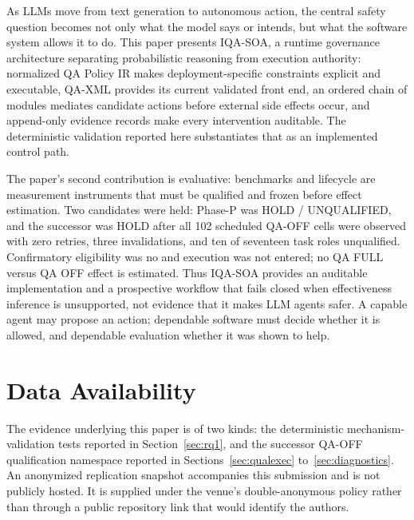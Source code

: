 \documentclass[acmsmall,screen,review,anonymous]{acmart}
\begin{document}
As LLMs move from text generation to autonomous action, the central safety question
becomes not only what the model says or intends, but what the software system
allows it to do. This paper presents IQA-SOA, a runtime governance architecture
separating probabilistic reasoning from execution authority: normalized QA Policy
IR makes deployment-specific constraints explicit and executable, QA-XML provides
its current validated front end, an ordered chain of modules mediates candidate
actions before external side effects occur, and
append-only evidence records make every intervention auditable. The deterministic
validation reported here substantiates that as an implemented control path.

The paper's second contribution is evaluative: benchmarks and lifecycle are
measurement instruments that must be qualified and frozen before effect estimation.
Two candidates were held: Phase-P was HOLD / UNQUALIFIED, and the successor was
HOLD after all 102 scheduled QA-OFF cells were observed with zero retries, three
invalidations, and ten of seventeen task roles unqualified. Confirmatory eligibility
was no and execution was not entered; no QA FULL versus QA OFF effect is estimated.
Thus IQA-SOA provides an auditable implementation and a prospective workflow that
fails closed when effectiveness inference is unsupported, not evidence that it
makes LLM agents safer. A capable agent may propose an action; dependable software
must decide whether it is allowed, and dependable evaluation whether it was shown
to help.


\section*{Data Availability}
\label{pg:dataavail}

The evidence underlying this paper is of two kinds: the deterministic
mechanism-validation tests reported in Section~\ref{sec:rq1}, and the successor
QA-OFF qualification namespace reported in Sections~\ref{sec:qualexec}
to~\ref{sec:diagnostics}. An anonymized replication snapshot accompanies this
submission and is not publicly hosted. It is supplied under the venue's
double-anonymous policy rather than through a public repository link that would
identify the authors.
\end{document}
